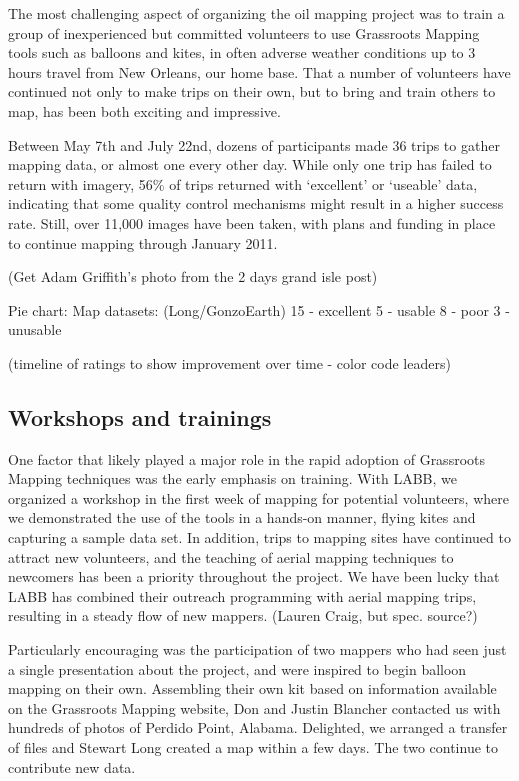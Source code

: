 \documentclass[11pt,oneside,notitlepage]{report}
\begin{document}
The most challenging aspect of organizing the oil mapping project was to train a group of inexperienced but committed volunteers to use Grassroots Mapping tools such as balloons and kites, in often adverse weather conditions up to 3 hours travel from New Orleans, our home base. That a number of volunteers have continued not only to make trips on their own, but to bring and train others to map, has been both exciting and impressive.

Between May 7th and July 22nd, dozens of participants made 36 trips to gather mapping data, or almost one every other day. While only one trip has failed to return with imagery, 56\% of trips returned with `excellent' or `useable' data, indicating that some quality control mechanisms might result in a higher success rate. Still, over 11,000 images have been taken, with plans and funding in place to continue mapping through January 2011. 

(Get Adam Griffith's photo from the 2 days grand isle post)

Pie chart: Map datasets: (Long/GonzoEarth)
15 - excellent
5 - usable
8 - poor
3 - unusable

(timeline of ratings to show improvement over time - color code leaders)

\subsection{Workshops and trainings}

One factor that likely played a major role in the rapid adoption of Grassroots Mapping techniques was the early emphasis on training. With \ac{LABB}, we organized a workshop in the first week of mapping for potential volunteers, where we demonstrated the use of the tools in a hands-on manner, flying kites and capturing a sample data set. In addition, trips to mapping sites have continued to attract new volunteers, and the teaching of aerial mapping techniques to newcomers has been a priority throughout the project. We have been lucky that \ac{LABB} has combined their outreach programming with aerial mapping trips, resulting in a steady flow of new mappers. (Lauren Craig, but spec. source?) 

Particularly encouraging was the participation of two mappers who had seen just a single presentation about the project, and were inspired to begin balloon mapping on their own. Assembling their own kit based on information available on the Grassroots Mapping website, Don and Justin Blancher contacted us with hundreds of photos of Perdido Point, Alabama. Delighted, we arranged a transfer of files and Stewart Long created a map within a few days. The two continue to contribute new data.  
\end{document}
